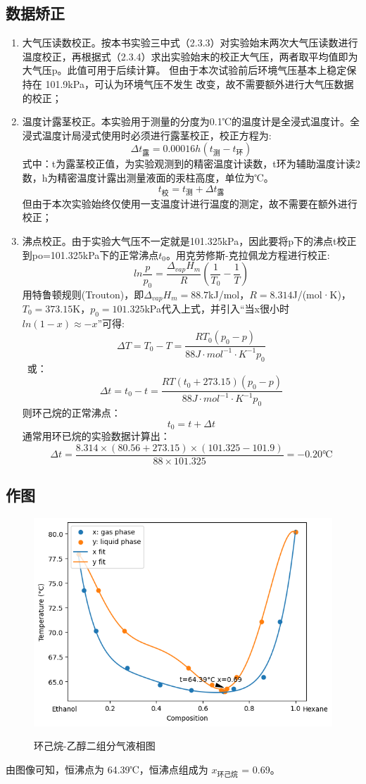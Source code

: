 \documentclass[12pt,hyperref,a4paper,UTF8]{ctexart}
\begin{document}
\subsection{数据矫正}
\begin{enumerate}
    \item 大气压读数校正。按本书实验三中式（2.3.3）对实验始末两次大气压读数进行温度校正，再根据式（2.3.4）求出实验始末的校正大气压，两者取平均值即为大气压p。此值可用于后续计算。
    但由于本次试验前后环境气压基本上稳定保持在 101.9kPa，可认为环境气压不发生
改变，故不需要额外进行大气压数据的校正；
    \item 温度计露茎校正。本实验用于测量的分度为0.1℃的温度计是全浸式温度计。全浸式温度计局浸式使用时必须进行露茎校正，校正方程为:
    \[ \Delta t_{\text{露}} = 0.00016h(t_{\text{测}} - t_{\text{环}}) \]
    式中：t为露茎校正值，为实验观测到的精密温度计读数，t环为辅助温度计读2数，h为精密温度计露出测量液面的汞柱高度，单位为℃。
    \[ t_{\text{校}} = t_{\text{测}} + \Delta t_{\text{露}} \]
    但由于本次实验始终仅使用一支温度计进行温度的测定，故不需要在额外进行
校正；
    \item 沸点校正。由于实验大气压不一定就是101.325kPa，因此要将p下的沸点t校正到po=101.325kPa下的正常沸点$t_0$。用克劳修斯-克拉佩龙方程进行校正:
    \[ln \frac{p}{p_0} = \frac{\Delta {}_{vap} H_m}{R}(\frac{1}{T_0} - \frac{1}{T})\]
    用特鲁顿规则(Trouton)，即$\Delta {}_{vap}H_m = 88.7$kJ/mol，$R = 8.314$J/(mol·K)，$T_0 = 373.15$K，$p_0 = 101.325$kPa代入上式，并引入“当x很小时$ln(1-x) \approx -x$”可得:
    \[ \Delta T = T_0 - T = \frac{RT_0(p_0-p)}{88J\cdot mol^{-1} \cdot K^{-1} p_0}\]\
    或：
    \[ \Delta t = t_0 - t = \frac{RT(t_0 + 273.15)(p_0-p)}{88J\cdot mol^{-1} \cdot K^{-1} p_0}\]
    则环己烷的正常沸点：
    \[ t_0 = t + \Delta t \]
    通常用环已烷的实验数据计算出：
    \[\Delta t = \frac{8.314 \times (80.56 + 273.15) \times (101.325 - 101.9)}{88 \times 101.325} = -0.20 \text{℃}\]
\end{enumerate}


\subsection{作图}


\begin{figure}[H]
    \centering
    \includegraphics[width=0.8\linewidth]{fig.png}
    \label{fig:enter-label}
    \caption{环己烷-乙醇二组分气液相图}
\end{figure}
由图像可知，恒沸点为 64.39℃，恒沸点组成为 $x_{\text{环己烷}}$ = 0.69。
\end{document}
